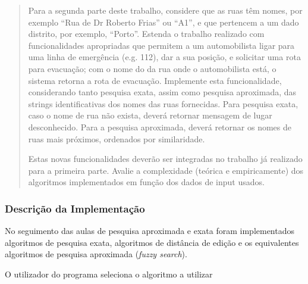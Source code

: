\documentclass[relatorio.tex]{subfiles}
\begin{document}
\begin{quote}
Para a segunda parte deste trabalho, considere que as ruas têm nomes, por exemplo “Rua de Dr Roberto Frias” ou “A1”, e que pertencem a um dado distrito, por exemplo, “Porto”. Estenda o trabalho realizado com funcionalidades apropriadas que permitem a um automobilista ligar para uma linha de emergência (e.g. 112), dar a sua posição, e solicitar uma rota para evacuação; com o nome do da rua onde o automobilista está, o sistema retorna a rota de evacuação. Implemente esta funcionalidade, considerando tanto pesquisa exata, assim como pesquisa aproximada, das strings identificativas dos nomes das ruas fornecidas. Para pesquisa exata, caso o nome de rua não exista, deverá retornar mensagem de lugar desconhecido. Para a pesquisa aproximada, deverá retornar os nomes de ruas mais próximos, ordenados por similaridade.

Estas novas funcionalidades deverão ser integradas no trabalho já realizado para a primeira parte. Avalie a complexidade (teórica e empiricamente) dos algoritmos implementados em função dos dados de input usados.
\end{quote}



\subsubsection{Descrição da Implementação}

No seguimento das aulas de pesquisa aproximada e exata foram implementados algoritmos de pesquisa exata, algoritmos de distância de edição e os equivalentes algoritmos de pesquisa aproximada (\textit{fuzzy search}).

O utilizador do programa seleciona o algoritmo a utilizar
\end{document}
